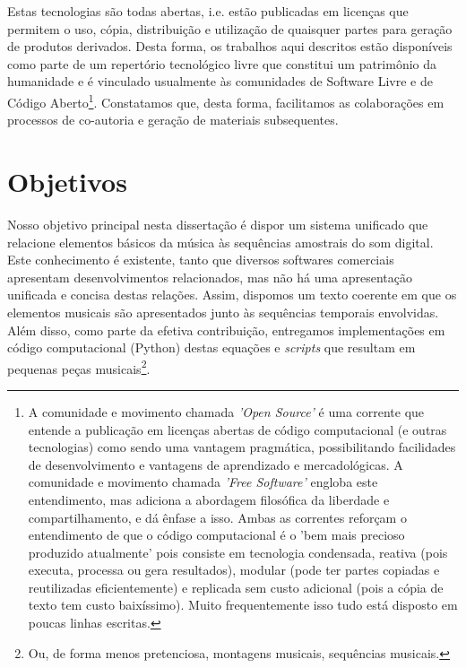 Estas tecnologias são todas abertas, i.e. estão publicadas em licenças que permitem o uso, cópia, distribuição e utilização de quaisquer partes para geração de produtos derivados. Desta forma, os trabalhos aqui descritos estão disponíveis como parte de um repertório tecnológico livre que constitui um patrimônio da humanidade e é vinculado usualmente às comunidades de Software Livre e de Código Aberto\footnote{A comunidade e movimento chamada \emph{'Open Source'} é uma corrente que entende a publicação em licenças abertas de código computacional (e outras tecnologias) como sendo uma vantagem pragmática, possibilitando facilidades de desenvolvimento e vantagens de aprendizado e mercadológicas. A comunidade e movimento chamada \emph{'Free Software'} engloba este entendimento, mas adiciona a abordagem filosófica da liberdade e compartilhamento, e dá ênfase a isso. Ambas as correntes reforçam o entendimento de que o código computacional é o 'bem mais  precioso produzido atualmente' pois consiste em tecnologia condensada, reativa (pois executa, processa ou gera resultados), modular (pode ter partes copiadas e reutilizadas eficientemente) e replicada sem custo adicional (pois a cópia de texto tem custo baixíssimo). Muito frequentemente isso tudo está disposto em poucas linhas escritas.}. Constatamos que, desta forma, facilitamos as colaborações em processos de co-autoria e geração de materiais subsequentes.

    \section{Objetivos}
   \label{sec:objetivos}
Nosso objetivo principal nesta dissertação é dispor um sistema unificado que relacione elementos básicos da música às sequências amostrais do som digital. Este conhecimento é existente, tanto que diversos softwares comerciais apresentam desenvolvimentos relacionados, mas não há uma apresentação unificada e concisa destas relações. Assim, dispomos um texto coerente em que os elementos musicais são apresentados junto às sequências temporais envolvidas. Além disso, como parte da efetiva contribuição, entregamos implementações em código computacional (Python) destas equações e \emph{scripts} que resultam em pequenas peças musicais\footnote{Ou, de forma menos pretenciosa, montagens musicais, sequências musicais.}. 

